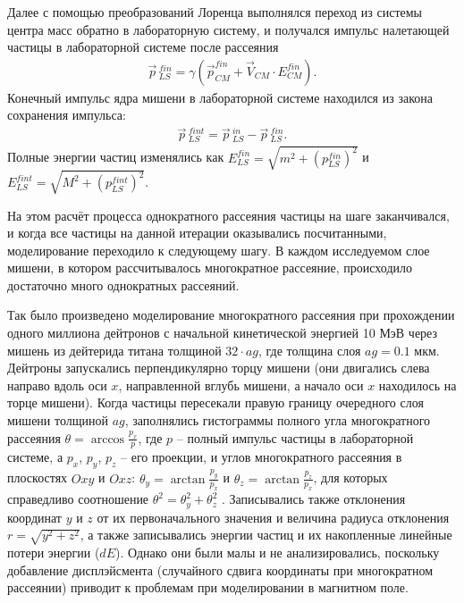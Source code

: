 \documentclass[a4paper,12pt]{article}
\begin{document}
\begin{large}
  Далее с помощью преобразований Лоренца выполнялся переход из системы центра масс обратно в лабораторную систему, и получался импульс налетающей частицы в лабораторной системе после рассеяния
\begin{equation}
\label{MSlsincMomentumAfter}
\begin{aligned} 
\vec{p}\,_{LS}^{fin} = \gamma \left( \vec{p}^{fin}_{CM} + \vec{V}_{CM} \cdot E^{fin}_{CM} \right).
\end{aligned}
\end{equation}
Конечный импульс ядра мишени в лабораторной системе находился из закона сохранения импульса:
\begin{equation}
\label{MSlstargetMomentumAfter}
\begin{aligned} 
\vec{p}\,_{LS}^{fint} = \vec{p}\,_{LS}^{in} - \vec{p}\,_{LS}^{fin}.
\end{aligned}
\end{equation}
Полные энергии частиц изменялись как $E_{LS}^{fin}=\sqrt{m^2+\left( p_{LS}^{fin} \right)^2 }$ и $E_{LS}^{fint}=\sqrt{M^2+\left( p_{LS}^{fint} \right)^2 }$.

  На этом расчёт процесса однократного рассеяния частицы на шаге заканчивался, и когда все частицы на данной итерации оказывались посчитанными, моделирование переходило к следующему шагу.
  В каждом исследуемом слое мишени, в котором рассчитывалось многократное рассеяние, происходило достаточно много однократных рассеяний.

  Так было произведено моделирование многократного рассеяния при прохождении одного миллиона дейтронов с начальной кинетической энергией 10 МэВ через мишень из дейтерида титана толщиной $32 \cdot ag$, где толщина слоя $ag=0.1$ мкм.
  Дейтроны запускались перпендикулярно торцу мишени (они двигались слева направо вдоль оси $x$, направленной вглубь мишени, а начало оси $x$ находилось на торце мишени).
  Когда частицы пересекали правую границу очередного слоя мишени толщиной $ag$, заполнялись гистограммы полного угла многократного рассеяния $\theta=\arccos{\frac{p_x}{p}}$, где $p$ -- полный импульс частицы в лабораторной системе, а $p_x$, $p_y$, $p_z$ -- его проекции, и углов многократного рассеяния в плоскостях $Oxy$ и $Oxz$: $\theta_y=\arctan{\frac{p_y}{p_x}}$ и $\theta_z=\arctan{\frac{p_z}{p_x}}$, для которых справедливо соотношение $\theta^2=\theta_y^2+\theta_z^2$ \cite{PDG}.
  Записывались также отклонения координат $y$ и $z$ от их первоначального значения и величина радиуса отклонения $r=\sqrt{y^2+z^2}$, а также записывались энергии частиц и их накопленные линейные потери энергии ($dE$).
  Однако они были малы и не анализировались, поскольку добавление дисплэйсмента (случайного сдвига координаты при многократном рассеянии) приводит к проблемам при моделировании в магнитном поле.


\end{large}
\end{document}
